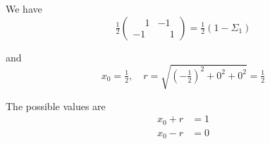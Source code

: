 


\bigskip
We have
\begin{equation*}
\tfrac{1}{2}\begin{pmatrix}\phantom{-}1&-1\\-1&\phantom{-}1\end{pmatrix}
=\tfrac{1}{2}(1-\Sigma_1)
\end{equation*}

and
\begin{equation*}
x_0=\tfrac{1}{2},\quad r=\sqrt{\left(-\tfrac{1}{2}\right)^2+0^2+0^2}=\tfrac{1}{2}
\end{equation*}

The possible values are
\begin{align*}
x_0+r&=1
\\
x_0-r&=0
\end{align*}


